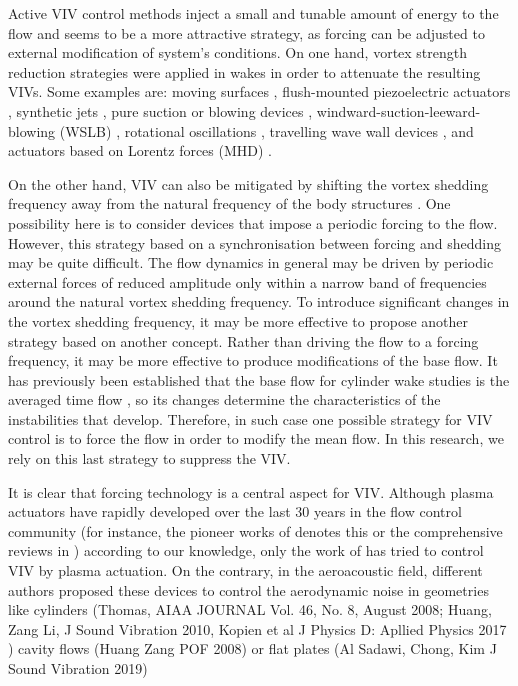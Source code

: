 \documentclass[review]{elsarticle}
\begin{document}
Active VIV control methods inject a small and tunable amount of energy to the flow and seems to be a more attractive strategy, as forcing can be adjusted to external modification of system's conditions. On one hand, vortex strength reduction strategies were applied in  wakes in order to attenuate the resulting VIVs. Some examples are: moving surfaces \citep{Korkischko2012}, flush-mounted piezoelectric actuators \citep{Zhang2004}, synthetic jets \citep{Wang2016a}, pure suction \citep{Chen2014} or blowing devices \citep{Skaugset2003}, windward-suction-leeward-blowing (WSLB) \citep{Wang2016b}, rotational oscillations \citep{Du2015}, travelling wave wall devices \citep{Xu2014}, and actuators based on  Lorentz forces (MHD) \citep{Chen2005}.

On the other hand, VIV can also be mitigated by shifting the vortex shedding frequency away from the natural frequency of the body structures \citep{Wang2017, Du2015}. One possibility here is to consider devices that impose a periodic forcing to the flow. However, this strategy based on a synchronisation between forcing and shedding may be quite difficult. The flow dynamics in general may be driven by periodic external forces of reduced amplitude only within a narrow band of frequencies around the natural vortex shedding frequency. To introduce significant changes in the vortex shedding frequency, it may be more effective to propose another strategy based on another concept. Rather than driving the flow to a forcing frequency, it may be more effective to produce modifications of the base flow. It has previously been established that the base flow for cylinder wake studies is the averaged time flow \citep{Barkley2006}, so its changes  determine the characteristics of the instabilities that develop.  Therefore, in such case one possible strategy for VIV control is to force the flow in order to modify the mean flow. In this research, we rely on this last strategy to suppress the VIV.

It is clear that forcing technology is a central aspect for VIV. Although plasma actuators have rapidly developed over the last 30 years in the flow control community (for instance, the pioneer works of \cite{Roth2000, Artana1999} denotes this or the comprehensive reviews in \cite{Moreau2007, Corke2010, Wang2013}) according to our knowledge, only the work of \cite{Sari2010} has tried to control VIV by plasma actuation. On the contrary, in the aeroacoustic field, different authors proposed these devices to control the aerodynamic noise in geometries like cylinders (Thomas, AIAA JOURNAL Vol. 46, No. 8, August 2008; Huang, Zang Li, J Sound Vibration 2010, Kopien et al J Physics D: Apllied Physics 2017 ) cavity flows (Huang Zang POF 2008)  or flat plates (Al Sadawi, Chong, Kim J Sound Vibration 2019)
\end{document}
